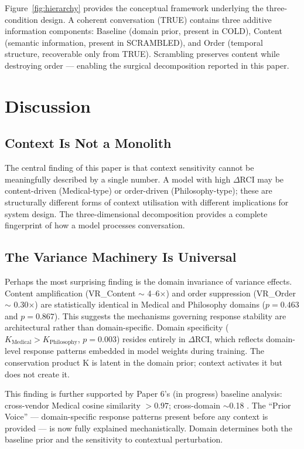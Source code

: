 \documentclass[11pt,a4paper]{article}
\begin{document}
Figure~\ref{fig:hierarchy} provides the conceptual framework underlying the three-condition design. A coherent conversation (TRUE) contains three additive information components: Baseline (domain prior, present in COLD), Content (semantic information, present in SCRAMBLED), and Order (temporal structure, recoverable only from TRUE). Scrambling preserves content while destroying order --- enabling the surgical decomposition reported in this paper.

\section{Discussion}

\subsection{Context Is Not a Monolith}

The central finding of this paper is that context sensitivity cannot be meaningfully described by a single number. A model with high $\Delta$RCI may be content-driven (Medical-type) or order-driven (Philosophy-type); these are structurally different forms of context utilisation with different implications for system design. The three-dimensional decomposition provides a complete fingerprint of how a model processes conversation.

\subsection{The Variance Machinery Is Universal}

Perhaps the most surprising finding is the domain invariance of variance effects. Content amplification (VR\_Content $\sim$ 4--6$\times$) and order suppression (VR\_Order $\sim$ 0.30$\times$) are statistically identical in Medical and Philosophy domains ($p = 0.463$ and $p = 0.867$). This suggests the mechanisms governing response stability are architectural rather than domain-specific. Domain specificity ($K_\text{Medical} > K_\text{Philosophy}$, $p = 0.003$) resides entirely in $\Delta$RCI, which reflects domain-level response patterns embedded in model weights during training. The conservation product K is latent in the domain prior; context activates it but does not create it.

This finding is further supported by Paper 6's (in progress) baseline analysis: cross-vendor Medical cosine similarity $> 0.97$; cross-domain $\sim$0.18 \citep{laxman2026paper6}. The ``Prior Voice'' --- domain-specific response patterns present before any context is provided --- is now fully explained mechanistically. Domain determines both the baseline prior and the sensitivity to contextual perturbation.
\end{document}
